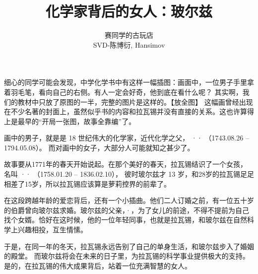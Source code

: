 \documentclass[a4paper]{article}
\title{化学家背后的女人：玻尔兹}
\author{赛同学的古玩店 \\ SVD-陈博衍, Hansimov}
\begin{document}
\maketitle

细心的同学可能会发现，中学化学书中有这样一幅插图：画面中，一位男子手里拿着羽毛笔，看向自己的右侧。有人一定会好奇，他到底在看什么呢？
其实啊，我们的教材中只放了原图的一半，完整的图片是这样的。【放全图】
这幅画曾经出现在不少名著的封面上，虽然似乎书的内容和拉瓦锡并没有直接的关系。这也许算得上是最早的“开局一张图，故事全靠编”了。


画中的男子，就是是 18 世纪伟大的化学家，近代化学之父，
\os{}{-}·· （1743.08.26 – 1794.05.08）。
而对画中的女子，大部分人可能就知之甚少了。


故事要从1771年的春天开始说起。在那个美好的春天，拉瓦锡结识了一个女孩，
名叫 \os{}{-}·· （1758.01.20 – 1836.02.10），
彼时玻尔兹才 13 岁，和28岁的拉瓦锡足足相差了15岁，所以拉瓦锡应该算是萝莉控界的前辈了。

在这段跨越年龄的爱恋背后，还有一个小插曲。他们二人订婚之前，有一位五十岁的伯爵曾向玻尔兹求婚。玻尔兹的父亲，·，为了女儿的前途，不得不提前为自己找个女婿。恰好在这时候，他的一位年轻同事，也就是拉瓦锡，和玻尔兹在自然科学上兴趣相投，互生情愫。

于是，在同一年的冬天，拉瓦锡永远告别了自己的单身生活，和玻尔兹步入了婚姻的殿堂。
而玻尔兹将会在未来的日子里，为拉瓦锡的科学事业提供极大的支持。是的，在拉瓦锡的伟大成果背后，站着一位充满智慧的女人。
\end{document}
